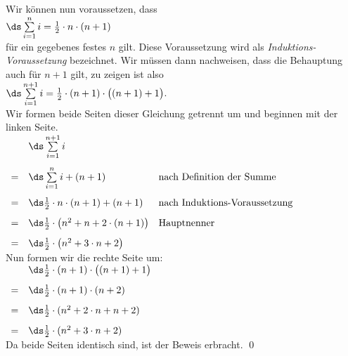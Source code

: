 \begin{enumerate}
      Wir k\"{o}nnen nun voraussetzen, dass
      \\[0.2cm]
      \hspace*{1.3cm}
      $\ds\sum\limits_{i=1}^n i = \frac{1}{2} \cdot n \cdot (n+1)$
      \\[0.2cm]
      f\"{u}r ein gegebenes festes $n$ gilt.  Diese Voraussetzung wird als \emph{Induktions-Voraussetzung}
      bezeichnet.  Wir m\"{u}ssen dann nachweisen, dass  die Behauptung auch
      f\"{u}r $n+1$ gilt, zu zeigen ist also 
      \\[0.2cm]
      \hspace*{1.3cm}
      $\ds\sum\limits_{i=1}^{n+1} i = \frac{1}{2} \cdot (n+1) \cdot \bigl((n+1)+1\bigr)$.
      \\[0.2cm]
      Wir formen beide Seiten dieser Gleichung getrennt um und beginnen mit der linken Seite.
      \\[0.2cm]
      \hspace*{1.3cm}
      $
      \begin{array}[t]{cll}
        &\ds \sum\limits_{i=1}^{n+1} i                                                       \\[0.5cm]
      = &\ds \sum\limits_{i=1}^{n} i + (n+1)          & \mbox{nach Definition der Summe}     \\[0.5cm]
      = &\ds \frac{1}{2} \cdot n \cdot (n+1) + (n+1)  & \mbox{nach Induktions-Voraussetzung} \\[0.3cm]
      = &\ds \frac{1}{2} \cdot \bigl( n^2 + n  + 2 \cdot(n+1)\bigr)  & \mbox{Hauptnenner} \\[0.3cm]
      = &\ds \frac{1}{2} \cdot \bigl( n^2 + 3 \cdot n  + 2 \bigr)  
      \end{array}
      $
      \\[0.2cm]
      Nun formen wir die rechte Seite um:
      \\[0.2cm]
      \hspace*{1.3cm}
      $
      \begin{array}[t]{cl}
         &\ds \frac{1}{2} \cdot (n+1) \cdot \bigl((n+1)+1\bigr) \\[0.3cm]
       = &\ds \frac{1}{2} \cdot (n+1) \cdot (n+2)               \\[0.3cm]
       = & \ds \frac{1}{2} \cdot (n^2  + 2 \cdot n + n + 2)     \\[0.3cm]
       = &\ds \frac{1}{2} \cdot (n^2  + 3 \cdot n + 2)  
      \end{array}
      $
      \\[0.2cm]
      Da beide Seiten identisch sind, ist der Beweis erbracht. \qed
\end{enumerate}



